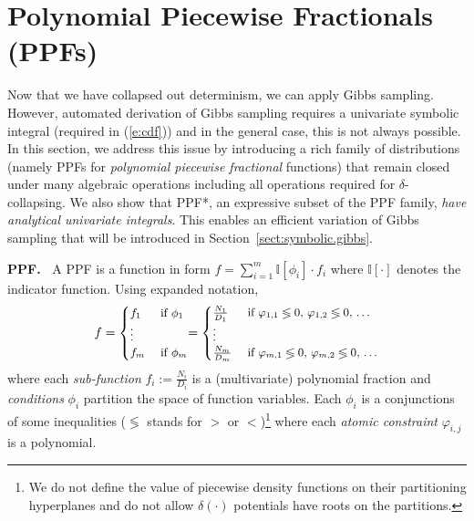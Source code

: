 \documentclass[]{article}
\newcommand{\indicator}{\mathbb{I}}%
\newcommand{\case}[2]{#2 &\text{ if } #1}%
\begin{document}




\section{Polynomial Piecewise Fractionals 
(PPFs)}
\label{sect:ppfs}
Now that we have collapsed out determinism, we can apply Gibbs sampling.
However, automated derivation of Gibbs sampling requires a univariate symbolic integral
(required in (\ref{e:cdf})) and in the general case, this is not always possible.
In this section, we address this issue by introducing a rich family of distributions (namely PPFs for \emph{polynomial piecewise fractional} functions)
that remain closed under many algebraic operations including all operations required for $\delta$-collapsing. 
We also show that PPF*, an expressive subset of the PPF family, \emph{have analytical univariate integrals}.
This enables an efficient variation of Gibbs sampling that will be introduced in Section~\ref{sect:symbolic.gibbs}.

{\bf PPF.\ } A PPF is a function in form
$f = \sum_{i=1}^m \indicator[\phi_i]\cdot f_i $ where $\indicator[\cdot]$ denotes the indicator function.
Using expanded notation, 
\begin{equation}\footnotesize
\label{e:ppf}
f =
  \begin{cases}
  \case{\phi_1}{f_1}\\
\vdots\\
  \case{\phi_m}{f_m}    
  \end{cases}
\!\!=
  \begin{cases}
  \case{\varphi_{1,1} \lessgtr 0,\, \varphi_{1,2} \lessgtr 0,\, \ldots}{\frac{N_1}{D_1}} \\
\vdots\\
   \case{\varphi_{m,1} \lessgtr 0,\, \varphi_{m,2} \lessgtr 0,\, \ldots}{\frac{N_m}{D_m}}    
  \end{cases}
\end{equation}
where each \emph{sub-function} $f_i := \frac{N_i}{D_i}$ is a (multivariate) polynomial fraction and
\emph{conditions} $\phi_i$ partition the space of function variables. 
Each $\phi_i$ is a conjunctions of some inequalities ($\lessgtr$ stands for  
$>$ or $<$)\footnote{
We do not define the value of piecewise density functions on their partitioning hyperplanes and do not allow $\delta(\cdot)$ potentials have roots on the partitions. 
} 
where each \emph{atomic constraint} $\varphi_{i,j}$ is a polynomial.
\end{document}
